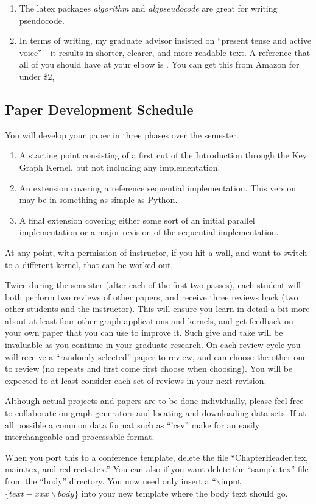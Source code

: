 \begin{enumerate}[noitemsep,nolistsep,leftmargin=*]
    \item The latex packages \textit{algorithm} and \textit{algpseudocode} are great for writing pseudocode.
    
    \item In terms of writing, my graduate advisor insisted on ``present tense and active voice'' - it results in shorter, clearer, and more readable text. A reference that all of you should have at your elbow is \cite{strunk1999elements}. You can get this from Amazon for under \$2,

\end{enumerate}

\subsection{Paper Development Schedule}

You will develop your paper in three phases over the semester.
\begin{enumerate}
    \item A starting point consisting of a first cut of the Introduction through the Key Graph Kernel, but not including any implementation.
    \item An extension covering a reference sequential implementation. This version may be in something as simple as Python.
    \item A final extension covering either some sort of an initial parallel implementation or a major revision of the sequential implementation.
\end{enumerate}

At any point, with permission of instructor, if you hit a wall, and want to switch to a different kernel, that can be worked out.

Twice during the semester (after each of the first two passes), each student will both perform  two reviews of other papers, and receive three reviews back (two other students and the instructor). This will ensure you learn in detail a bit more about at least four other graph applications and kernels, and get feedback on your own paper that you can use to improve it. Such give and take will be invaluable as you continue in your graduate research. On each review cycle you will receive a ``randomly selected'' paper to review, and can choose the other one to review (no repeats and first come first choose when choosing). You will be expected to at least consider each set of reviews in your next revision.

Although actual projects and papers are to be done individually, please feel free to collaborate on graph generators and locating and downloading data sets. If at all possible a common data format such as ``'csv'' make for an easily interchangeable and processable format.

When you port this to a conference template, delete the file ``ChapterHeader.tex, main.tex, and redirects.tex.'' You can also if you want delete the ``sample.tex'' file from the ``body'' directory. You now need only insert a ``$\backslash$input$\{text-xxx \backslash body\}$ into your new template where the body text should go.

    